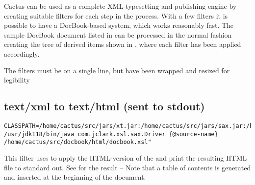 



Cactus can be used as a complete XML-typesetting and publishing engine
by creating suitable filters for each step in the process.  With a few
filters it is possible to have a DocBook-based system, which works
reasonably fast.  The sample DocBook document listed in
 can be processed in the normal fashion
creating the tree of derived items shown in
, where each filter has been applied accordingly.


The filters must be on a single line, but have been wrapped and resized for legibility
\subsection*{text/xml to text/html (sent to stdout)}
{\footnotesize
\begin{verbatim}
CLASSPATH=/home/cactus/src/jars/xt.jar:/home/cactus/src/jars/sax.jar:/home/cactus/src/jars/xp.jar
/usr/jdk118/bin/java com.jclark.xsl.sax.Driver {@source-name} /home/cactus/src/docbook/html/docbook.xsl"
\end{verbatim}
}
This filter uses  to
apply the HTML-version of the
 and print the resulting HTML file to standard out.  See
 for the result --  Note that a table of
  contents is generated and inserted at the beginning of the document.

